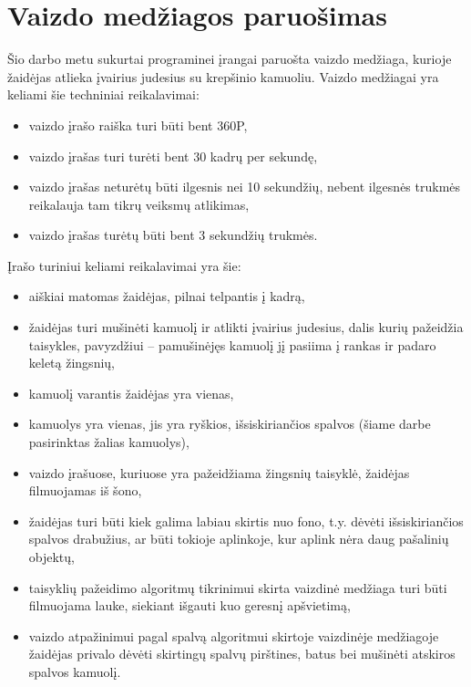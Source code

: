 \documentclass{VUMIFPSbakalaurinis}
\begin{document}
\section{Vaizdo medžiagos paruošimas}

Šio darbo metu sukurtai programinei įrangai paruošta vaizdo medžiaga, kurioje žaidėjas atlieka įvairius judesius su krepšinio kamuoliu. Vaizdo medžiagai yra keliami šie techniniai reikalavimai: 

\begin{itemize}
	\item vaizdo įrašo raiška turi būti bent 360P,
	\item vaizdo įrašas turi turėti bent 30 kadrų per sekundę,
	\item vaizdo įrašas neturėtų būti ilgesnis nei 10 sekundžių, nebent ilgesnės trukmės reikalauja tam tikrų veiksmų atlikimas,
	\item vaizdo įrašas turėtų būti bent 3 sekundžių trukmės.
\end{itemize}

Įrašo turiniui keliami reikalavimai yra šie:

\begin{itemize}
	\item aiškiai matomas žaidėjas, pilnai telpantis į kadrą,
	\item žaidėjas turi mušinėti kamuolį ir atlikti įvairius judesius, dalis kurių pažeidžia taisykles, pavyzdžiui – pamušinėjęs kamuolį jį pasiima į rankas ir padaro keletą žingsnių,
	\item kamuolį varantis žaidėjas yra vienas, 
	\item kamuolys yra vienas, jis yra ryškios, išsiskiriančios spalvos (šiame darbe pasirinktas žalias kamuolys), 
	\item vaizdo įrašuose, kuriuose yra pažeidžiama žingsnių taisyklė, žaidėjas filmuojamas iš šono,
	\item žaidėjas turi būti kiek galima labiau skirtis nuo fono, t.y. dėvėti išsiskiriančios spalvos drabužius, ar būti tokioje aplinkoje, kur aplink nėra daug pašalinių objektų,
	\item taisyklių pažeidimo algoritmų tikrinimui skirta vaizdinė medžiaga turi būti filmuojama lauke, siekiant išgauti kuo geresnį apšvietimą, 
	\item vaizdo atpažinimui pagal spalvą algoritmui skirtoje vaizdinėje medžiagoje žaidėjas privalo dėvėti skirtingų spalvų pirštines, batus bei mušinėti atskiros spalvos kamuolį.
\end{itemize}
\end{document}
